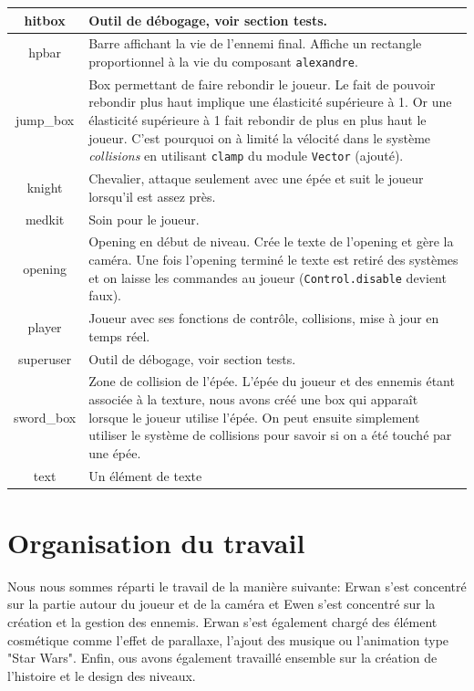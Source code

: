 \documentclass{article}
\begin{document}
\begin{center}
\begin{tabular}[h]{ |c|p{10cm}| }
        \hline
        hitbox & Outil de débogage, voir section tests. \\
        \hline
        hpbar & Barre affichant la vie de l'ennemi final. Affiche un rectangle proportionnel à la vie du composant \verb|alexandre|. \\
        \hline
        jump\_box & Box permettant de faire rebondir le joueur. Le fait de pouvoir rebondir plus haut implique une élasticité 
        supérieure à 1. Or une élasticité supérieure à 1 fait rebondir de plus en plus haut le joueur. C'est pourquoi on à limité la 
        vélocité dans le système \textit{collisions} en utilisant \verb|clamp| du module \verb|Vector| (ajouté). \\
        \hline
        knight & Chevalier, attaque seulement avec une épée et suit le joueur lorsqu'il est assez près. \\
        \hline
        medkit & Soin pour le joueur. \\
        \hline
        opening & Opening en début de niveau. Crée le texte de l'opening et gère la caméra. Une fois l'opening terminé 
        le texte est retiré des systèmes et on laisse les commandes au joueur (\verb|Control.disable| devient faux). \\
        \hline
        player & Joueur avec ses fonctions de contrôle, collisions, mise à jour en temps réel. \\
        \hline
        superuser & Outil de débogage, voir section tests. \\
        \hline
        sword\_box & Zone de collision de l'épée. L'épée du joueur et des ennemis étant associée à la texture, nous avons 
        créé une box qui apparaît lorsque le joueur utilise l'épée. On peut ensuite simplement utiliser le système de collisions 
        pour savoir si on a été touché par une épée. \\
        \hline
        text & Un élément de texte \\
        \hline

    \end{tabular}
\end{center}



\section{Organisation du travail}

Nous nous sommes réparti le travail de la manière suivante:
Erwan s'est concentré sur la partie autour du joueur et de la caméra et Ewen s'est concentré sur la création et
la gestion des ennemis.
Erwan s'est également chargé des élément cosmétique comme l'effet de parallaxe, l'ajout des musique ou 
l'animation type "Star Wars".
Enfin, ous avons également travaillé ensemble sur la création de l'histoire et le design des niveaux.
\end{document}
